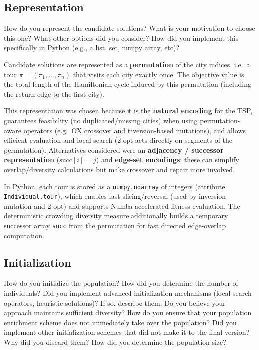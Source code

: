 \documentclass[a4paper,10pt]{article}
\newcommand{\ReplaceMe}[1]{{\color{blue}#1}}
\begin{document}
\subsection{Representation}\label{sec_rep}

\ReplaceMe{How do you represent the candidate solutions? What is your motivation to choose this one? What other options did you consider? How did you implement this specifically in Python (e.g., a list, set, numpy array, etc)?}

Candidate solutions are represented as a \textbf{permutation} of the city indices, i.e.\ a tour
$\pi = (\pi_1,\dots,\pi_n)$ that visits each city exactly once. The objective value is the total length of the
Hamiltonian cycle induced by this permutation (including the return edge to the first city).

This representation was chosen because it is the \textbf{natural encoding} for the TSP, guarantees feasibility
(no duplicated/missing cities) when using permutation-aware operators (e.g.\ OX crossover and inversion-based
mutations), and allows efficient evaluation and local search (2-opt acts directly on segments of the permutation).
Alternatives considered were an \textbf{adjacency / successor representation} ($\text{succ}[i]=j$) and
\textbf{edge-set encodings}; these can simplify overlap/diversity calculations but make crossover and repair
more involved.

In Python, each tour is stored as a \texttt{numpy.ndarray} of integers (attribute \texttt{Individual.tour}),
which enables fast slicing/reversal (used by inversion mutation and 2-opt) and supports Numba-accelerated fitness
evaluation. The deterministic crowding diversity measure additionally builds a temporary successor array
\texttt{succ} from the permutation for fast directed edge-overlap computation.


\subsection{Initialization}

\ReplaceMe{How do you initialize the population? How did you determine the number of individuals? Did you implement advanced initialization mechanisms (local search operators, heuristic solutions)? If so, describe them. Do you believe your approach maintains sufficient diversity? How do you ensure that your population enrichment scheme does not immediately take over the population? Did you implement other initialization schemes that did not make it to the final version? Why did you discard them? How did you determine the population size?}
\end{document}
